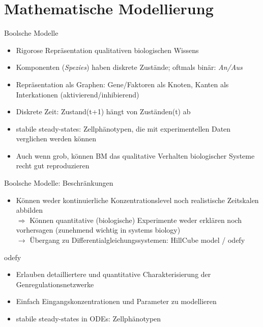 \documentclass[handout]{beamer}
\begin{document}
\section{Mathematische Modellierung}

\begin{frame}{Boolsche Modelle}
\begin{itemize}
	\item Rigorose Repr\"asentation qualitativen biologischen Wissens
	\pause
	\item Komponenten (\emph{Spezies}) haben diskrete Zust\"ande; oftmals bin\"ar: \emph{An/Aus}
	\pause
	\item Repr\"asentation als Graphen: Gene/Faktoren als Knoten, Kanten als Interkationen (aktivierend/inhibierend)
	\pause
	\item Diskrete Zeit: Zustand(t+1) h\"angt von Zust\"anden(t) ab
	\pause
	\item stabile steady-states: Zellph\"anotypen, die mit experimentellen Daten verglichen werden k\"onnen
	\pause
	\item Auch wenn grob, k\"onnen BM das qualitative Verhalten biologischer Systeme recht gut reproduzieren
\end{itemize}
\end{frame}

\begin{frame}{Boolsche Modelle: Beschr\"ankungen}
\begin{itemize}
	\item K\"onnen weder kontinuierliche Konzentrationslevel noch realistische Zeitskalen abbilden
	\pause
	\\ $\Rightarrow$ K\"onnen quantitative (biologische) Experimente weder erkl\"aren noch vorhersagen
	\pause (zunehmend wichtig in systems biology)
	\\ \pause $\rightarrow$ \"Ubergang zu Differentialgleichungssystemen: HillCube model / odefy
\end{itemize}
\end{frame}

\begin{frame}{odefy}
\begin{itemize}
	\item Erlauben detailliertere und quantitative Charakterisierung der Genregulationsnetzwerke
	\pause
	\item Einfach Eingangskonzentrationen und Parameter zu modellieren
	\pause
	\item stabile steady-states in ODEs: Zellph\"anotypen
\end{itemize}
\end{frame}
\end{document}
